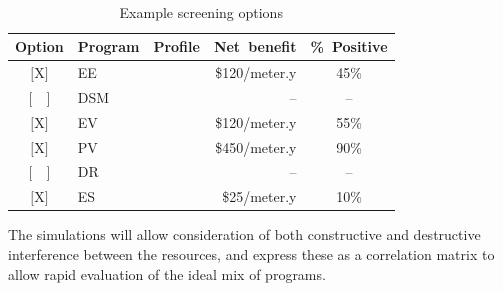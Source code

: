 \documentclass[10pt,twocolumn]{article}
\begin{document}
\begin{table}[!t]
    \caption{Example screening options}
    \label{tab:screening}
    \centering
    ~\\
    \begin{tabular}{cllrc}
        \hline
        Option & Program & Profile & Net~benefit & \%~Positive
    \\  \hline \hline
        $[$X$]$ & EE && \$120/meter.y & 45\%
    \\  $[$~~$]$ & DSM && -- & --
    \\  $[$X$]$ & EV && \$120/meter.y & 55\%
    \\  $[$X$]$ & PV && \$450/meter.y & 90\%
    \\  $[$~~$]$ & DR && -- & --
    \\  $[$X$]$ & ES && \$25/meter.y & 10\%
    \\  \hline
    \end{tabular}
\end{table}
The simulations will allow consideration of both constructive and destructive interference between the resources, and express these as a correlation matrix to allow rapid evaluation of the ideal mix of programs. 
\end{document}
